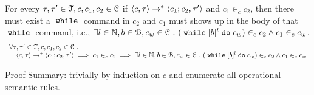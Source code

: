%
%
\begin{lem}
	\label{lem:inv_while}
	For every $\mathtt{\tau}, \mathtt{\tau}' \in \mathcal{T}, c, c_1, c_2 \in \mathcal{C}$ 
	if $ \langle c, \mathtt{\tau} \rangle \rightarrow^* \langle c_1; c_2, \mathtt{\tau}' \rangle$ and 
	$c_1 \in_c c_2$, 
	then there must exist a $\;\mathtt{while}\;$ command in $c_2$ and $c_1$ must shows up in the body of that $\;\mathtt{while}\;$ command,
	 i.e., $\exists l \in \mathbb{N}, b \in \mathcal{B}, c_w \in \mathcal{C} ~.~ 
	(\;\mathtt{while}\; [b]^l \;\mathtt{do}\; c_w) \in_c c_2 \land c_1 \in_c c_w$.
	\[
	\begin{array}{l}
	\forall \mathtt{\tau}, \mathtt{\tau}' \in \mathcal{T}, c, c_1, c_2 \in \mathcal{C} ~.~
		\\ \quad
		\langle c, \mathtt{\tau} \rangle \rightarrow^* \langle c_1; c_2, \mathtt{\tau}' \rangle
		\implies
		c_1 \in_c c_2
		\implies
		\exists l \in \mathbb{N}, b \in \mathcal{B}, c_w \in \mathcal{C} ~.~ 
		(\;\mathtt{while}\; [b]^l \;\mathtt{do}\; c_w) \in_c c_2 \land c_1 \in_c c_w
	\end{array}
	\]
	\end{lem}	
	Proof Summary: trivially by induction on $c$ and enumerate all operational semantic rules.
